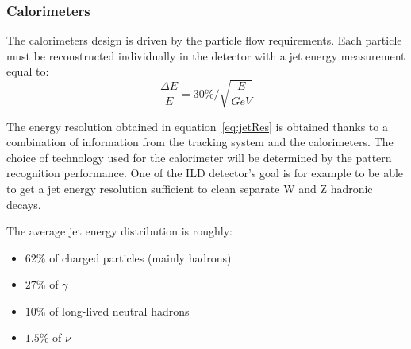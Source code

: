 
      \subsubsection{Calorimeters}

      The calorimeters design is driven by the particle flow requirements.
      Each particle must be reconstructed individually in the detector with a jet energy measurement equal to:
      \begin{equation}
        \frac{\Delta E}{E} = 30 \% / \sqrt{\frac{E}{GeV}}
        \label{eq:jetRes}
      \end{equation}

      The energy resolution obtained in equation~\ref{eq:jetRes} is obtained thanks to a combination of information from the tracking system and the calorimeters. 
      The choice of technology used for the calorimeter will be determined by the pattern recognition performance. 
      One of the \gls{ILD} detector's goal is for example to be able to get a jet energy resolution sufficient to clean separate W and Z hadronic decays.
      
      The average jet energy distribution is roughly: 
      \begin{itemize}
        \item $62 \%$ of charged particles (mainly hadrons)
        \item $27 \%$ of $\gamma$
        \item $10 \%$ of long-lived neutral hadrons
        \item $1.5 \%$ of $\nu$
      \end{itemize}

